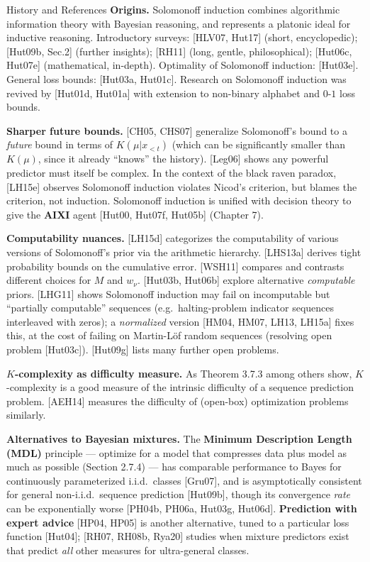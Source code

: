 \documentclass[aspectratio=169,10pt]{beamer}
\begin{document}
\begin{frame}[allowframebreaks]{History and References}
  \textbf{Origins.} Solomonoff induction combines algorithmic information
  theory with Bayesian reasoning, and represents a platonic ideal for
  inductive reasoning. Introductory surveys: [HLV07, Hut17] (short,
  encyclopedic); [Hut09b, Sec.2] (further insights); [RH11] (long, gentle,
  philosophical); [Hut06c, Hut07e] (mathematical, in-depth). Optimality of
  Solomonoff induction: [Hut03e]. General loss bounds: [Hut03a, Hut01c].
  Research on Solomonoff induction was revived by [Hut01d, Hut01a] with
  extension to non-binary alphabet and $0$-$1$ loss bounds.

  \vspace{2mm}
  \textbf{Sharper future bounds.} [CH05, CHS07] generalize Solomonoff's
  bound to a \emph{future} bound in terms of $K(\mu|x_{<t})$ (which can be
  significantly smaller than $K(\mu)$, since it already ``knows'' the
  history). [Leg06] shows any powerful predictor must itself be complex. In
  the context of the black raven paradox, [LH15e] observes Solomonoff
  induction violates Nicod's criterion, but blames the criterion, not
  induction. Solomonoff induction is unified with decision theory to give
  the \textbf{AIXI} agent [Hut00, Hut07f, Hut05b] (Chapter 7).

  \framebreak
  \textbf{Computability nuances.} [LH15d] categorizes the computability of
  various versions of Solomonoff's prior via the arithmetic hierarchy.
  [LHS13a] derives tight probability bounds on the cumulative error.
  [WSH11] compares and contrasts different choices for $M$ and $w_\nu$.
  [Hut03b, Hut06b] explore alternative \emph{computable} priors.
  [LHG11] shows Solomonoff induction may fail on incomputable but
  ``partially computable'' sequences (e.g.\ halting-problem indicator
  sequences interleaved with zeros); a \emph{normalized} version [HM04, HM07,
  LH13, LH15a] fixes this, at the cost of failing on Martin-L\"of random
  sequences (resolving open problem [Hut03c]). [Hut09g] lists many further
  open problems.

  \vspace{2mm}
  \textbf{$K$-complexity as difficulty measure.} As Theorem 3.7.3 among
  others show, $K$-complexity is a good measure of the intrinsic difficulty
  of a sequence prediction problem. [AEH14] measures the difficulty of
  (open-box) optimization problems similarly.

  \framebreak
  \textbf{Alternatives to Bayesian mixtures.} The \textbf{Minimum
  Description Length (MDL)} principle --- optimize for a model that
  compresses data plus model as much as possible (Section 2.7.4) --- has
  comparable performance to Bayes for continuously parameterized i.i.d.\
  classes [Gru07], and is asymptotically consistent for general non-i.i.d.\
  sequence prediction [Hut09b], though its convergence \emph{rate} can be
  exponentially worse [PH04b, PH06a, Hut03g, Hut06d]. \textbf{Prediction with
  expert advice} [HP04, HP05] is another alternative, tuned to a particular
  loss function [Hut04]; [RH07, RH08b, Rya20] studies when mixture
  predictors exist that predict \emph{all} other measures for ultra-general
  classes.


\end{frame}
\end{document}
